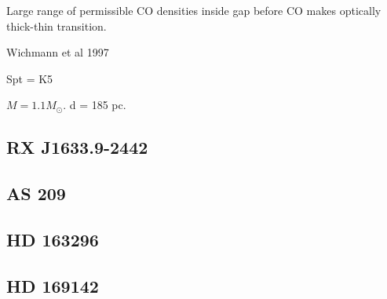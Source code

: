 \documentclass[iop,floatfix,numberedappendix,twocolappendix]{emulateapj}
\begin{document}
Large range of permissible CO densities inside gap before CO makes optically thick-thin transition.

\citep{andrews11}
Wichmann et al 1997

Spt = K5

$M = 1.1 M_\odot$.
d = 185 pc.

\subsection{RX J1633.9-2442}

\subsection{AS 209}

\subsection{HD 163296}

\subsection{HD 169142}
\end{document}
